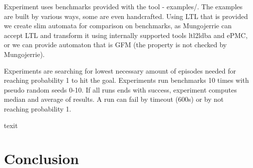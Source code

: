\documentclass[
	digital
nolof, nolot
]{fithesis3}
\begin{document}
	Experiment uses benchmarks provided with the tool - examples/. The examples are built by various ways, some are even handcrafted. Using LTL that is provided we create slim automata for comparison on benchmarks, as Mungojerrie can accept LTL and transform it using internally supported tools ltl2ldba and ePMC, or we can provide automaton that is GFM (the property is not checked by Mungojerrie).
	
	Experiments are searching for lowest necessary amount of episodes needed for reaching probability 1 to hit the goal. Experiments run benchmarks 10 times with pseudo random seeds 0-10. If all runs ends with success, experiment computes median and average of results. A run can fail by timeout (600s) or by not reaching probability 1.
	
	\begin{table}
		\centering
		\caption{texit}
		
	\end{table}
	
	

	
	
	\chapter{Conclusion}
\end{document}
